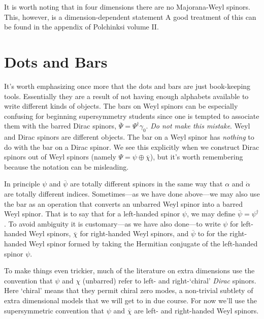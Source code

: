 It is worth noting that in four dimensions there are no Majorana-Weyl spinors. This, however, is a dimension-dependent statement A good treatment of this can be found in the appendix of Polchinksi volume II\autocite{Polchinski:1998rr}.


\section{Dots and Bars}

It's worth emphasizing once more that the dots and bars are just book-keeping tools. Essentially they are a result of not having enough alphabets available to write different kinds of objects. The bars on Weyl spinors can be especially confusing for beginning supersymmetry students since one is tempted to associate them with the barred Dirac spinors, $\overline\Psi = \Psi^\dagger \gamma_0$. \emph{Do not make this mistake}. Weyl and Dirac spinors are different objects. The bar on a Weyl spinor has \emph{nothing} to do with the bar on a Dirac spinor. We see this explicitly when we construct Dirac spinors out of Weyl spinors (namely $\Psi = \psi\oplus\overline\chi$), but it's worth remembering because the notation can be misleading. %

In principle $\psi$ and $\overline\psi$ are totally different spinors in the same way that $\alpha$ and $\dot\alpha$ are totally different indices. Sometimes---as we have done above---we may also use the bar as an operation that converts an unbarred Weyl spinor into a barred Weyl spinor. That is to say that for a left-handed spinor $\psi$, we may define $\overline\psi=\psi^\dag$. To avoid ambiguity it is customary---as we have also done---to write $\psi$ for left-handed Weyl spinors, $\overline\chi$ for right-handed Weyl spinors, and $\overline\psi$ to for the right-handed Weyl spinor formed by taking the Hermitian conjugate of the left-handed spinor $\psi$.

To make things even trickier, much of the literature on extra dimensions use the convention that $\psi$ and $\chi$ (unbarred) refer to left- and right-`chiral' \textit{Dirac} spinors. Here `chiral' means that they permit chiral zero modes, a non-trivial subtlety of extra dimensional models that we will get to in due course. For now we'll use the supersymmetric convention that $\psi$ and $\overline\chi$ are left- and right-handed Weyl spinors.




